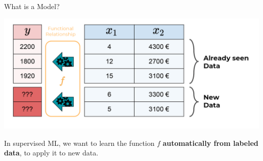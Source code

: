 \documentclass[11pt,compress,t,notes=noshow, xcolor=table]{beamer}
\begin{document}
\begin{frame}{What is a Model?}
\begin{center}\includegraphics[width=\textwidth]{figure_man/what_is_a_model_web} \end{center}

In supervised ML, we want to learn the function \(f\) \textbf{automatically from labeled data}, to apply it to new data.

\end{frame}
\end{document}
